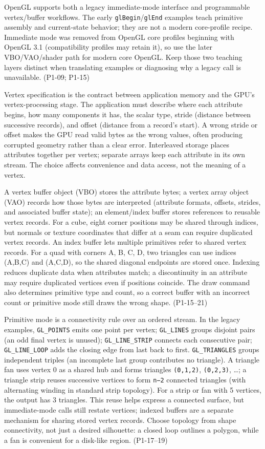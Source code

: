 OpenGL supports both a legacy immediate-mode interface and programmable vertex/buffer workflows. The early \texttt{glBegin}/\texttt{glEnd} examples teach primitive assembly and current-state behavior; they are not a modern core-profile recipe. Immediate mode was removed from OpenGL core profiles beginning with OpenGL 3.1 (compatibility profiles may retain it), so use the later VBO/VAO/shader path for modern core OpenGL. Keep those two teaching layers distinct when translating examples or diagnosing why a legacy call is unavailable. (P1-09; P1-15)

Vertex specification is the contract between application memory and the GPU's vertex-processing stage. The application must describe where each attribute begins, how many components it has, the scalar type, stride (distance between successive records), and offset (distance from a record's start). A wrong stride or offset makes the GPU read valid bytes as the wrong values, often producing corrupted geometry rather than a clear error. Interleaved storage places attributes together per vertex; separate arrays keep each attribute in its own stream. The choice affects convenience and data access, not the meaning of a vertex.

A vertex buffer object (VBO) stores the attribute bytes; a vertex array object (VAO) records how those bytes are interpreted (attribute formats, offsets, strides, and associated buffer state); an element/index buffer stores references to reusable vertex records. For a cube, eight corner positions may be shared through indices, but normals or texture coordinates that differ at a seam can require duplicated vertex records. An index buffer lets multiple primitives refer to shared vertex records. For a quad with corners A, B, C, D, two triangles can use indices (A,B,C) and (A,C,D), so the shared diagonal endpoints are stored once. Indexing reduces duplicate data when attributes match; a discontinuity in an attribute may require duplicated vertices even if positions coincide. The draw command also determines primitive type and count, so a correct buffer with an incorrect count or primitive mode still draws the wrong shape. (P1-15--21)

Primitive mode is a connectivity rule over an ordered stream. In the legacy examples, \texttt{GL\_POINTS} emits one point per vertex; \texttt{GL\_LINES} groups disjoint pairs (an odd final vertex is unused); \texttt{GL\_LINE\_STRIP} connects each consecutive pair; \texttt{GL\_LINE\_LOOP} adds the closing edge from last back to first. \texttt{GL\_TRIANGLES} groups independent triples (an incomplete last group contributes no triangle). A triangle fan uses vertex 0 as a shared hub and forms triangles \texttt{(0,1,2)}, \texttt{(0,2,3)}, \ldots; a triangle strip reuses successive vertices to form \texttt{n−2} connected triangles (with alternating winding in standard strip topology). For a strip or fan with 5 vertices, the output has 3 triangles. This reuse helps express a connected surface, but immediate-mode calls still restate vertices; indexed buffers are a separate mechanism for sharing stored vertex records. Choose topology from shape connectivity, not just a desired silhouette: a closed loop outlines a polygon, while a fan is convenient for a disk-like region. (P1-17--19)

